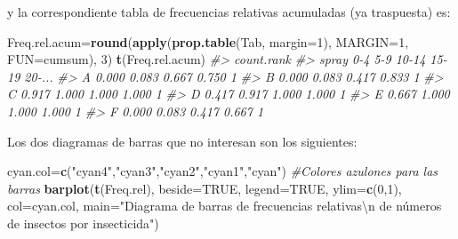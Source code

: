 \documentclass[
]{book}
\newenvironment{Shaded}{\begin{snugshade}}{\end{snugshade}}
\newcommand{\CharTok}[1]{\textcolor[rgb]{0.31,0.60,0.02}{#1}}
\newcommand{\CommentTok}[1]{\textcolor[rgb]{0.56,0.35,0.01}{\textit{#1}}}
\newcommand{\DataTypeTok}[1]{\textcolor[rgb]{0.13,0.29,0.53}{#1}}
\newcommand{\DecValTok}[1]{\textcolor[rgb]{0.00,0.00,0.81}{#1}}
\newcommand{\KeywordTok}[1]{\textcolor[rgb]{0.13,0.29,0.53}{\textbf{#1}}}
\newcommand{\NormalTok}[1]{#1}
\newcommand{\OtherTok}[1]{\textcolor[rgb]{0.56,0.35,0.01}{#1}}
\newcommand{\StringTok}[1]{\textcolor[rgb]{0.31,0.60,0.02}{#1}}
\theoremstyle{definition}
\theoremstyle{definition}
\theoremstyle{definition}
\theoremstyle{remark}
\begin{document}
y la correspondiente tabla de frecuencias relativas acumuladas (ya traspuesta) es:

\begin{Shaded}
\begin{Highlighting}[]
\NormalTok{Freq.rel.acum=}\KeywordTok{round}\NormalTok{(}\KeywordTok{apply}\NormalTok{(}\KeywordTok{prop.table}\NormalTok{(Tab, }\DataTypeTok{margin=}\DecValTok{1}\NormalTok{), }\DataTypeTok{MARGIN=}\DecValTok{1}\NormalTok{, }\DataTypeTok{FUN=}\NormalTok{cumsum), }\DecValTok{3}\NormalTok{)}
\KeywordTok{t}\NormalTok{(Freq.rel.acum)}
\CommentTok{\#\textgreater{}      count.rank}
\CommentTok{\#\textgreater{} spray   0{-}4   5{-}9 10{-}14 15{-}19 20{-}...}
\CommentTok{\#\textgreater{}     A 0.000 0.083 0.667 0.750      1}
\CommentTok{\#\textgreater{}     B 0.000 0.083 0.417 0.833      1}
\CommentTok{\#\textgreater{}     C 0.917 1.000 1.000 1.000      1}
\CommentTok{\#\textgreater{}     D 0.417 0.917 1.000 1.000      1}
\CommentTok{\#\textgreater{}     E 0.667 1.000 1.000 1.000      1}
\CommentTok{\#\textgreater{}     F 0.000 0.083 0.417 0.667      1}
\end{Highlighting}
\end{Shaded}

Los dos diagramas de barras que no interesan son los siguientes:

\begin{Shaded}
\begin{Highlighting}[]
\NormalTok{cyan.col=}\KeywordTok{c}\NormalTok{(}\StringTok{"cyan4"}\NormalTok{,}\StringTok{"cyan3"}\NormalTok{,}\StringTok{"cyan2"}\NormalTok{,}\StringTok{"cyan1"}\NormalTok{,}\StringTok{"cyan"}\NormalTok{) }\CommentTok{\#Colores azulones para las barras}
\KeywordTok{barplot}\NormalTok{(}\KeywordTok{t}\NormalTok{(Freq.rel), }\DataTypeTok{beside=}\OtherTok{TRUE}\NormalTok{, }\DataTypeTok{legend=}\OtherTok{TRUE}\NormalTok{,  }\DataTypeTok{ylim=}\KeywordTok{c}\NormalTok{(}\DecValTok{0}\NormalTok{,}\DecValTok{1}\NormalTok{), }\DataTypeTok{col=}\NormalTok{cyan.col, }
  \DataTypeTok{main=}\StringTok{"Diagrama de barras de frecuencias relativas}\CharTok{\textbackslash{}n}\StringTok{ de números de insectos por insecticida"}\NormalTok{)}
\end{Highlighting}
\end{Shaded}
\end{document}

